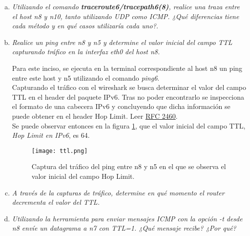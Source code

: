 \documentclass[osajnl,twocolumn,showpacs,superscriptaddress,10pt]{revtex4-1} %
\begin{document}
\begin{enumerate}[a)]
    \item \textit{Utilizando el comando \textbf{traceroute6/tracepath6(8)}, realice una
    traza entre el host n8 y n10, tanto utilizando UDP como ICMP.
    ¿Qué diferencias tiene cada método y en qué casos utilizaría cada
    uno?.}


    \item \textit{Realice un ping entre n8 y n5 y determine el valor inicial del
    campo TTL capturando tráfico en la interfaz eth0 del host n8.}

    Para este inciso, se ejecuta en la terminal correspondiente al host n8 un ping entre este host y n5
    utilizando el comando \textit{ping6}. \\

    Capturando el tráfico con el wireshark se busca determinar el valor del campo TTL en
    el header del paquete IPv6. Tras no poder encontrarlo se inspecciona el formato de una
    cabecera IPv6 y concluyendo que dicha información se puede obtener en el header Hop Limit. 
    Leer \href{https://tools.ietf.org/html/rfc2460}{RFC 2460}. \\

    Se puede observar entonces en la figura \ref{image:ttl}, que el valor inicial
    del campo TTL, \textit{Hop Limit en IPv6}, es 64.

    \begin{figure}[H]
        \centering
        \texttt{[image: ttl.png]}
        \caption{Captura del tráfico del ping entre n8 y n5 en el que se observa el valor inicial del campo Hop Limit.}
        \label{image:ttl}
    \end{figure}

    \item \textit{A través de la capturas de tráfico, determine en qué momento el
    router decrementa el valor del TTL.}

    

    \item \textit{Utilizando la herramienta para enviar mensajes ICMP con la opción
    -t desde n8 envíe un datagrama a n7 con TTL=1. ¿Qué mensaje recibe? ¿Por qué?}


\end{enumerate}
\end{document}
